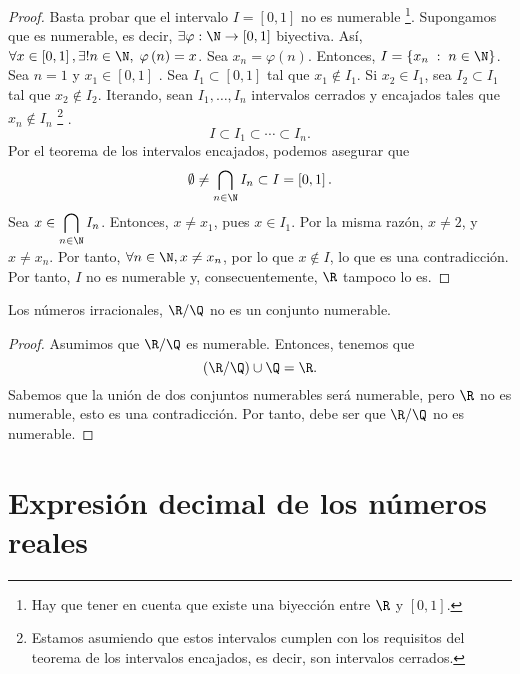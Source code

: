 \begin{proof}
	Basta probar que el intervalo $\displaystyle I =\left[0,1\right]  $ no es numerable \footnote{Hay que tener en cuenta que existe una biyección entre $\displaystyle \R $ y $\displaystyle \left[0,1\right]  $.}. Supongamos que es numerable, es decir, $\displaystyle \exists \varphi : \N \to \left[0,1\right]  $ biyectiva. Así, $\displaystyle \forall x \in \left[0,1\right], \exists! n \in \N, \; \varphi\left(n\right) =x $. Sea $\displaystyle x_{n}=\varphi\left(n\right) $. Entonces, $\displaystyle I = \left\{ x_{n} \; : \; n \in \N\right\}  $. Sea $\displaystyle n = 1 $ y $\displaystyle x_{1} \in [0,1] $ . Sea $\displaystyle I_{1} \subset \left[0,1\right]  $ tal que $\displaystyle x_{1} \not\in I_{1} $. Si $\displaystyle x_{2} \in I_{1} $, sea $\displaystyle I_{2}\subset I_{1} $ tal que $\displaystyle x_{2} \not\in I_{2} $. Iterando, sean $\displaystyle I_{1}, \ldots, I_{n} $ intervalos cerrados y encajados tales que $\displaystyle x_{n} \not\in I_{n} $ \footnote{Estamos asumiendo que estos intervalos cumplen con los requisitos del teorema de los intervalos encajados, es decir, son intervalos cerrados.} .
	\[I \subset I_{1} \subset \cdots \subset I_{n} .\]
Por el teorema de los intervalos encajados, podemos asegurar que 
\[\emptyset\neq\bigcap_{n\in \N} I_{n} \subset I = \left[0,1\right]  .\]
Sea $\displaystyle x \in \bigcap_{n\in \N}I_{n} $. Entonces, $\displaystyle x \neq x_{1}$, pues $x \in I_{1} $. Por la misma razón, $\displaystyle x \neq 2 $, y $\displaystyle x \neq x_{n} $. Por tanto, $\displaystyle \forall n \in \N, x \neq x_{n} $, por lo que $\displaystyle x \not\in I $, lo que es una contradicción. Por tanto, $\displaystyle I $ no es numerable y, consecuentemente, $\displaystyle \R $ tampoco lo es.
\end{proof}

\begin{fcolorary}[]
\normalfont Los números irracionales, $\displaystyle \R/\Q $ no es un conjunto numerable.
\end{fcolorary}

\begin{proof}
Asumimos que $\displaystyle \R/\Q $ es numerable. Entonces, tenemos que 
\[\left(\R/\Q\right)\cup\Q = \R .\]
Sabemos que la unión de dos conjuntos numerables será numerable, pero $\displaystyle \R $ no es numerable, esto es una contradicción. Por tanto, debe ser que $\displaystyle \R/\Q $ no es numerable.
\end{proof}

\section{Expresión decimal de los números reales}

